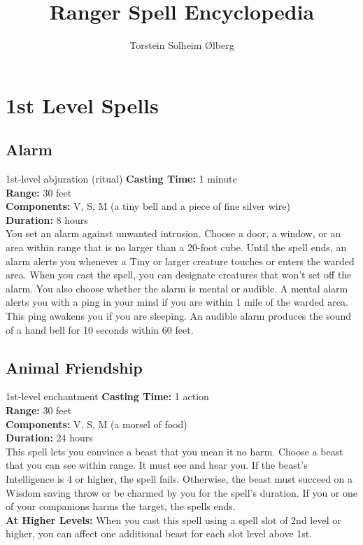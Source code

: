 \documentclass[11pt, A4paper, english]{article}
\author{Torstein Solheim Ølberg}
\title{Ranger Spell Encyclopedia}
\begin{document}
\maketitle

\tableofcontents




	\section{1st Level Spells}
		\subsection{Alarm}
1st-level abjuration (ritual)
\textbf{Casting Time:} 1 minute \\
\textbf{Range:} 30 feet \\
\textbf{Components:} V, S, M (a tiny bell and a piece of fine silver wire) \\
\textbf{Duration:} 8 hours \\
You set an alarm against unwanted intrusion. Choose a door, a window, or an area within range that is no larger than a 20-foot cube. Until the spell ends, an alarm alerts you whenever a Tiny or larger creature touches or enters the warded area. When you cast the spell, you can designate creatures that won’t set off the alarm. You also choose whether the alarm is mental or audible. A mental alarm alerts you with a ping in your mind if you are within 1 mile of the warded area. This ping awakens you if you are sleeping. An audible alarm produces the sound of a hand bell for 10 seconds within 60 feet.

		\subsection{Animal Friendship}
1st-level enchantment
\textbf{Casting Time:} 1 action \\
\textbf{Range:} 30 feet \\
\textbf{Components:} V, S, M (a morsel of food) \\
\textbf{Duration:} 24 hours \\
This spell lets you convince a beast that you mean it no harm. Choose a beast that you can see within range. It must see and hear you. If the beast’s Intelligence is 4 or higher, the spell fails. Otherwise, the beast must succeed on a Wisdom saving throw or be charmed by you for the spell’s duration. If you or one of your companions harms the target, the spells ends. \\
\textbf{At Higher Levels:} When you cast this spell using a spell slot of 2nd level or higher, you can affect one additional beast for each slot level above 1st.
\end{document}
